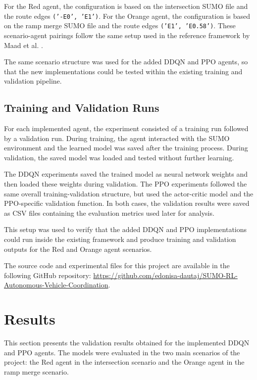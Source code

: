 \documentclass{article}
\begin{document}
For the Red agent, the configuration is based on the intersection SUMO file and the route edges \texttt{('-E0', 'E1')}. For the Orange agent, the configuration is based on the ramp merge SUMO file and the route edges \texttt{('E1', 'E0.58')}. These scenario-agent pairings follow the same setup used in the reference framework by Maad et al. \cite{maad2025dynamic}.

The same scenario structure was used for the added DDQN and PPO agents, so that the new implementations could be tested within the existing training and validation pipeline.

\subsection{Training and Validation Runs}

For each implemented agent, the experiment consisted of a training run followed by a validation run. During training, the agent interacted with the SUMO environment and the learned model was saved after the training process. During validation, the saved model was loaded and tested without further learning.

The DDQN experiments saved the trained model as neural network weights and then loaded these weights during validation. The PPO experiments followed the same overall training-validation structure, but used the actor-critic model and the PPO-specific validation function. In both cases, the validation results were saved as CSV files containing the evaluation metrics used later for analysis.

This setup was used to verify that the added DDQN and PPO implementations could run inside the existing framework and produce training and validation outputs for the Red and Orange agent scenarios.

\noindent
The source code and experimental files for this project are available in the following GitHub repository:
\href{https://github.com/edonisa-dautaj/SUMO-RL-Autonomous-Vehicle-Coordination}{https://github.com/edonisa-dautaj/SUMO-RL-Autonomous-Vehicle-Coordination}.

\section{Results}

This section presents the validation results obtained for the implemented DDQN and PPO agents. The models were evaluated in the two main scenarios of the project: the Red agent in the intersection scenario and the Orange agent in the ramp merge scenario.
\end{document}

